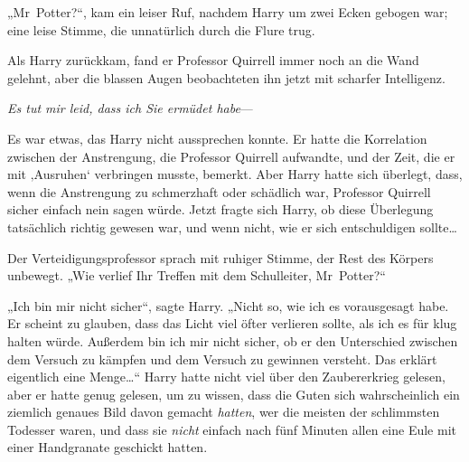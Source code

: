 „Mr~Potter?“, kam ein leiser Ruf, nachdem Harry um zwei Ecken gebogen war; eine leise Stimme, die unnatürlich durch die Flure trug.

Als Harry zurückkam, fand er Professor Quirrell immer noch an die Wand gelehnt, aber die blassen Augen beobachteten ihn jetzt mit scharfer Intelligenz.

\emph{Es tut mir leid, dass ich Sie ermüdet habe}—

Es war etwas, das Harry nicht aussprechen konnte. Er hatte die Korrelation zwischen der Anstrengung, die Professor Quirrell aufwandte, und der Zeit, die er mit ‚Ausruhen‘ verbringen musste, bemerkt. Aber Harry hatte sich überlegt, dass, wenn die Anstrengung zu schmerzhaft oder schädlich war, Professor Quirrell sicher einfach nein sagen würde. Jetzt fragte sich Harry, ob diese Überlegung tatsächlich richtig gewesen war, und wenn nicht, wie er sich entschuldigen sollte…

Der Verteidigungsprofessor sprach mit ruhiger Stimme, der Rest des Körpers unbewegt. „Wie verlief Ihr Treffen mit dem Schulleiter, Mr~Potter?“

„Ich bin mir nicht sicher“, sagte Harry. „Nicht so, wie ich es vorausgesagt habe. Er scheint zu glauben, dass das Licht viel öfter verlieren sollte, als ich es für klug halten würde. Außerdem bin ich mir nicht sicher, ob er den Unterschied zwischen dem Versuch zu kämpfen und dem Versuch zu gewinnen versteht. Das erklärt eigentlich eine Menge…“ Harry hatte nicht viel über den Zaubererkrieg gelesen, aber er hatte genug gelesen, um zu wissen, dass die Guten sich wahrscheinlich ein ziemlich genaues Bild davon gemacht \emph{hatten}, wer die meisten der schlimmsten Todesser waren, und dass sie \emph{nicht} einfach nach fünf Minuten allen eine Eule mit einer Handgranate geschickt hatten.

